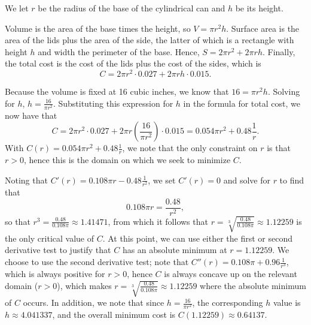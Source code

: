 \begin{activitySolution}
\ba
	\item We let $r$ be the radius of the base of the cylindrical can and $h$ be its height.
	\item Volume is the area of the base times the height, so $V = \pi r^2 h$.  Surface area is the area of the lids plus the area of the side, the latter of which is a rectangle with height $h$ and width the perimeter of the base.  Hence, $S = 2 \pi r^2 + 2 \pi r h$.  Finally, the total cost is the cost of the lids plus the cost of the sides, which is
	$$C = 2 \pi r^2 \cdot 0.027 + 2 \pi r h \cdot 0.015.$$
	\item Because the volume is fixed at 16 cubic inches, we know that $16 =  \pi r^2 h$.  Solving for $h$, $h = \frac{16}{\pi r^2}$.  Substituting this expression for $h$ in the formula for total cost, we now have that
	$$C = 2 \pi r^2 \cdot 0.027 + 2 \pi r \left( \frac{16}{\pi r^2} \right) \cdot 0.015 = 0.054 \pi r^2 + 0.48 \frac{1}{r} .$$
	With $C(r) = 0.054 \pi r^2 + 0.48 \frac{1}{r}$, we note that the only constraint on $r$ is that $r > 0$, hence this is the domain on which we seek to minimize $C$.
	\item Noting that $C'(r) = 0.108 \pi r - 0.48 \frac{1}{r^2}$, we set $C'(r) = 0$ and solve for $r$ to find that 
	$$0.108 \pi r = \frac{0.48}{r^2},$$
	so that $r^3 = \frac{0.48}{0.108 \pi} \approx 1.41471$, from which it follows that $r = \sqrt[3]{ \frac{0.48}{0.108 \pi} } \approx 1.12259$ is the only critical value of $C$.
	At this point, we can use either the first or second derivative test to justify that $C$ has an absolute minimum at $r = 1.12259$.  We choose to use the second derivative test; note that $C''(r) = 0.108 \pi + 0.96 \frac{1}{r^3}$, which is always positive for $r > 0$, hence $C$ is always concave up on the relevant domain ($r > 0$), which makes $r = \sqrt[3]{ \frac{0.48}{0.108 \pi} } \approx 1.12259$ where the absolute minimum of $C$ occurs.  In addition, we note that since $h = \frac{16}{\pi r^2}$, the corresponding $h$ value is $h \approx 4.041337$, and the overall minimum cost is $C(1.12259) \approx 0.64137$.
\ea\end{activitySolution}
\aftera